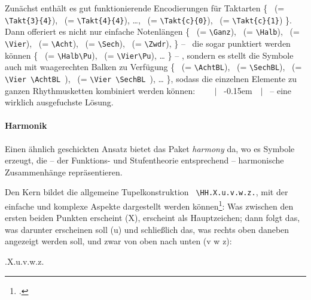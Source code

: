 Zunächst enthält es gut funktionierende Encodierungen für Taktarten \{ 
 \ (= \texttt{\small \textbackslash{Takt}\{3\}\{4\}}),
 \ (= \texttt{\small \textbackslash{Takt}\{4\}\{4\}}),
\ldots,
 \ (= \texttt{\small \textbackslash{Takt}\{c\}\{0\}}),
 \ (= \texttt{\small \textbackslash{Takt}\{c\}\{1\}})
\}.
Dann offeriert es nicht nur einfache Notenlängen \{
\Ganz \ (= \texttt{\small \textbackslash{Ganz}}),
\Halb \ (= \texttt{\small \textbackslash{Halb}}),
\Vier \ (= \texttt{\small \textbackslash{Vier}}),
\Acht \ (= \texttt{\small \textbackslash{Acht}}),
\Sech \ (= \texttt{\small \textbackslash{Sech}}),
\Zwdr \ (= \texttt{\small \textbackslash{Zwdr}}),
\}  -- \ die sogar punktiert werden können 
\{
\Halb\Pu \ (= \texttt{\small \textbackslash{Halb}\textbackslash{Pu}}),
\Vier\Pu \ (= \texttt{\small \textbackslash{Vier}\textbackslash{Pu}}),
\ldots
\}
-- ,
sondern es stellt die Symbole auch mit waagerechten Balken zu Verfügung
\{
\AchtBL \ (= \texttt{\small \textbackslash{AchtBL}}),
\SechBL \ (= \texttt{\small \textbackslash{SechBL}}),
\Vier\AchtBL \ (= \texttt{\small \textbackslash{Vier} \textbackslash{AchtBL} }),
\Vier\SechBL \ (= \texttt{\small \textbackslash{Vier} \textbackslash{SechBL} }),
\ldots
\}, 
sodass die einzelnen Elemente zu ganzen Rhythmusketten kombiniert werden können: 
 \Vier \ \Vier\AchtBL \ \Vier\Pu \ \Acht \ $|$ 
\AchtBR\Pu \SechBl \ \AchtBR\kern-0.15em\SechBR\Vier \ \SechBr\Vier\SechBl \ $|$
\ -- eine wirklich ausgefuchste Lösung.

\paragraph{\small Harmonik}$\;$ \\

Einen ähnlich geschickten Ansatz bietet das Paket \emph{harmony} da, wo es
Symbole erzeugt, die -- der Funktions- und Stufentheorie entsprechend --
harmonische Zusammenhänge repräsentieren.

Den Kern bildet die allgemeine Tupelkonstruktion \texttt{\small
\textbackslash{HH.X.u.v.w.z.}}, mit der einfache und komplexe Aspekte
dargestellt werden können\footcite[vgl. dazu][2ff]{WegWeg2007a}: Was zwischen
den ersten beiden Punkten erscheint (X), erscheint als Hauptzeichen; dann folgt
das, was darunter erscheinen soll (u) und schließlich das, was rechts oben
daneben angezeigt werden soll, und zwar von oben nach unten (v w z):

\begin{center}
\HH.X.u.v.w.z.
\end{center}

